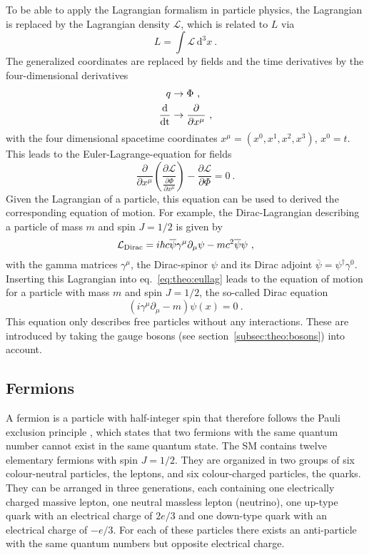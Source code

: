 \noindent To be able to apply the Lagrangian formalism in particle physics, the Lagrangian is replaced by the Lagrangian density $\mathcal{L}$, which is related to $L$ via
\begin{equation}
L=\int \! \mathcal{L} \, \mathrm{d}^3x ~.
\end{equation}
The generalized coordinates are replaced by fields and the time derivatives by the four-dimensional derivatives
\begin{align*}
q &\rightarrow \Phi ~, \\
\frac{\rm{d}}{\rm{dt}} &\rightarrow \frac{\partial}{\partial x^\mu} ~,
\end{align*}
with the four dimensional spacetime coordinates $x^\mu = (x^0,x^1,x^2,x^3)$, $x^0=t$. This leads to the Euler-Lagrange-equation for fields
\begin{equation}
\frac{\partial}{\partial x^\mu} \left( \frac{\partial \mathcal{L}}{\frac{\partial \Phi}{\partial x^\mu}} \right) - \frac{\partial \mathcal{L}}{\partial \Phi} = 0 ~. \label{eq:theo:eullag}
\end{equation}
Given the Lagrangian of a particle, this equation can be used to derived the corresponding equation of motion. For example, the Dirac-Lagrangian describing a particle of mass $m$ and spin $J=1/2$ is given by
\begin{equation}
\mathcal{L}_{\rm Dirac}=i\hbar c \overline{\psi} \gamma^\mu \partial_\mu \psi -  mc^2\overline{\psi}\psi ~, \label{eq:theo:diraclag}
\end{equation}
with the gamma matrices $\gamma^\mu$, the Dirac-spinor $\psi$ and its Dirac adjoint $\overline{\psi}=\psi^\dagger \gamma^0$. Inserting this Lagrangian into eq.~\ref{eq:theo:eullag} leads to the equation of motion for a particle with mass $m$ and spin $J=1/2$, the so-called Dirac equation
\begin{equation}
\left(i\gamma^\mu\partial_\mu-m\right)\psi(x)=0 ~.
\end{equation}
This equation only describes free particles without any interactions. These are introduced by taking the gauge bosons (see section~\ref{subsec:theo:bosons}) into account.

\subsection{Fermions}
A fermion is a particle with half-integer spin that therefore follows the Pauli exclusion principle \cite{pauli}, which states that two fermions with the same quantum number cannot exist in the same quantum state. The SM contains twelve elementary fermions with spin $J=1/2$. They are organized in two groups of six colour-neutral particles, the leptons, and six colour-charged particles, the quarks. They can be arranged in three generations, each containing one electrically charged massive lepton, one neutral massless lepton (neutrino), one up-type quark with an electrical charge of $2e/3$ and one down-type quark with an electrical charge of $-e/3$. For each of these particles there exists an anti-particle with the same quantum numbers but opposite electrical charge.\\
 
